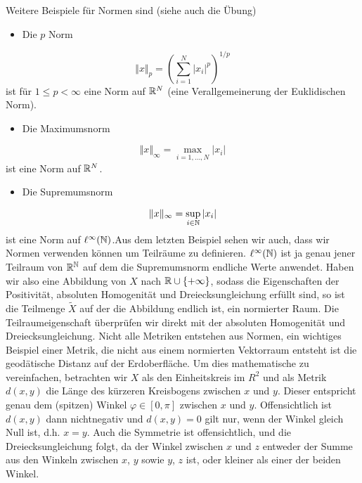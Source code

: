 Weitere Beispiele für Normen sind (siehe auch die Übung)
\begin{itemize}
\item {} 
Die \(p\) Norm

\end{itemize}
\begin{equation*}
 \Vert x \Vert_p = \left( \sum_{i=1}^N |x_i|^p \right)^{1/p}
\end{equation*}
ist für \(1 \leq p < \infty\) eine Norm auf \(\mathbb{R}^N\) (eine Verallgemeinerung der Euklidischen Norm).
\begin{itemize}
\item {} 
Die Maximumsnorm

\end{itemize}
\begin{equation*}
 \Vert x \Vert_\infty = \max_{i=1,\ldots,N} |x_i|
\end{equation*}
ist eine Norm auf \(\mathbb{R}^N\).
\begin{itemize}
\item {} 
Die Supremumsnorm

\end{itemize}
\begin{equation*}
 \Vert x \Vert_\infty = \sup_{i \in \mathbb{N}} |x_i|
\end{equation*}
ist eine Norm auf \(\ell^\infty(\mathbb{N})\).Aus dem letzten Beispiel sehen wir auch, dass wir Normen verwenden können um Teilräume zu definieren. \(\ell^\infty(\mathbb{N})\) ist ja genau jener Teilraum von \(\mathbb{R}^{\mathbb{N}}\) auf dem die Supremumsnorm endliche Werte anwendet. Haben wir also eine Abbildung von \(X  \) nach \(\mathbb{R} \cup \{+ \infty\}\), sodass die Eigenschaften der Positivität, absoluten Homogenität und Dreiecksungleichung erfüllt sind, so ist die Teilmenge \(\tilde X\) auf der die Abbildung endlich ist, ein normierter Raum. Die Teilraumeigenschaft überprüfen wir direkt mit der absoluten Homogenität und Dreiecksungleichung.
Nicht alle Metriken entstehen aus Normen, ein wichtiges Beispiel einer Metrik, die nicht aus einem normierten Vektorraum entsteht ist die geodätische Distanz auf der Erdoberfläche. Um dies mathematische zu vereinfachen, betrachten wir \(X\) als den Einheitskreis im \(R^2\) und als Metrik \(d(x,y)\) die Länge des kürzeren Kreisbogens zwischen \(x\) und \(y\). Dieser entspricht genau dem (spitzen) Winkel \(\varphi \in [0,\pi]\) zwischen \(x\) und \(y\). Offensichtlich ist \(d(x,y)\) dann nichtnegativ und \(d(x,y)=0\) gilt nur, wenn der Winkel gleich Null ist, d.h. \(x =y\). Auch die Symmetrie ist offensichtlich, und die Dreiecksungleichung folgt, da der Winkel zwischen \(x\) und \(z\) entweder der Summe aus den Winkeln zwischen \(x\), \(y\) sowie \(y\), \(z\) ist, oder kleiner als einer der beiden Winkel.


